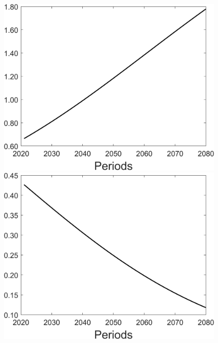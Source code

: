 \begin{figure}[h!!]
\begin{minipage}[]{0.32\textwidth}
\end{minipage}
\begin{minipage}[]{0.32\textwidth}
	\includegraphics[width=1\textwidth]{../../codding_model/Own/figures/Rep_agent/staticonlyRam_separate_pc_periods59_eppsilon0.40_zeta1.40_Ad08_Ac04_thetac0.70_thetad0.56_HetGrowth1_tauul0.181_util0_withtarget1_lgd0.png}
\end{minipage}
	\begin{minipage}[]{0.32\textwidth}
		\includegraphics[width=1\textwidth]{../../codding_model/Own/figures/Rep_agent/staticonlyRam_separate_pd_periods59_eppsilon0.40_zeta1.40_Ad08_Ac04_thetac0.70_thetad0.56_HetGrowth1_tauul0.181_util0_withtarget1_lgd0.png}

\end{minipage}
\end{figure}
